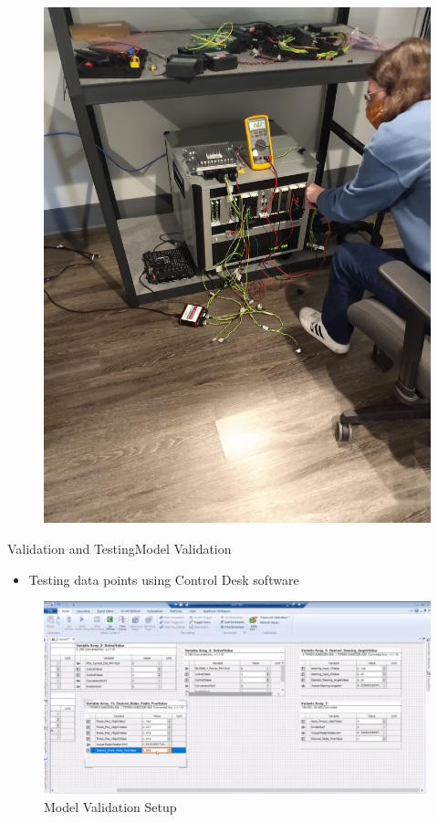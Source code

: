 \documentclass{beamer}
\begin{document}
\begin{frame}
\begin{figure}
\begin{minipage}{.5\textwidth}
	  		\includegraphics[angle=270,width=.85\linewidth]{figs/img/picturesVisitToAStuff/hilMeasurementHannah}
	  		\label{fig:test2}
		\end{minipage}
	\end{figure}
\end{frame}

\begin{frame}{Validation and Testing}{Model Validation}
	\begin{block}{}	
		\begin{itemize}
			\item Testing data points using Control Desk software  
		\end{itemize}		
		\begin{figure}
			\centering \includegraphics[width=.9\linewidth]{figs/img/aStuffValidationBrakeModel}
			\caption{Model Validation Setup}
    				\label{fig:validationSetup}
		\end{figure}
	\end{block}
\end{frame}
\end{document}
